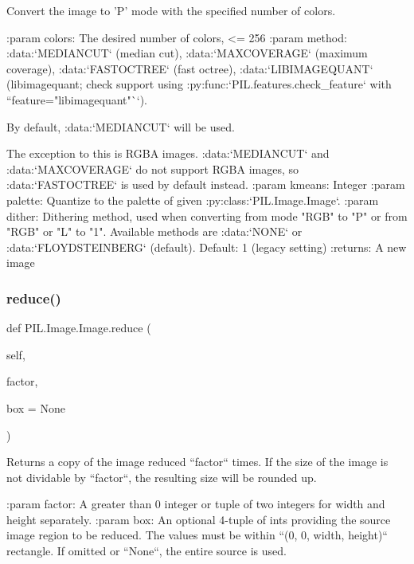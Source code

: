 \begin{DoxyVerb}Convert the image to 'P' mode with the specified number
of colors.

:param colors: The desired number of colors, <= 256
:param method: :data:`MEDIANCUT` (median cut),
       :data:`MAXCOVERAGE` (maximum coverage),
       :data:`FASTOCTREE` (fast octree),
       :data:`LIBIMAGEQUANT` (libimagequant; check support using
       :py:func:`PIL.features.check_feature`
       with ``feature="libimagequant"``).

       By default, :data:`MEDIANCUT` will be used.

       The exception to this is RGBA images. :data:`MEDIANCUT` and
       :data:`MAXCOVERAGE` do not support RGBA images, so
       :data:`FASTOCTREE` is used by default instead.
:param kmeans: Integer
:param palette: Quantize to the palette of given
        :py:class:`PIL.Image.Image`.
:param dither: Dithering method, used when converting from
   mode "RGB" to "P" or from "RGB" or "L" to "1".
   Available methods are :data:`NONE` or :data:`FLOYDSTEINBERG` (default).
   Default: 1 (legacy setting)
:returns: A new image\end{DoxyVerb}
 \mbox{\label{classPIL_1_1Image_1_1Image_a4a2352ec3f2155b13e8677188bbee94b}} 
\subsubsection{\texorpdfstring{reduce()}{reduce()}}
{\footnotesize\ttfamily def P\+I\+L.\+Image.\+Image.\+reduce (\begin{DoxyParamCaption}\item[{}]{self,  }\item[{}]{factor,  }\item[{}]{box = {\ttfamily None} }\end{DoxyParamCaption})}

\begin{DoxyVerb}Returns a copy of the image reduced ``factor`` times.
If the size of the image is not dividable by ``factor``,
the resulting size will be rounded up.

:param factor: A greater than 0 integer or tuple of two integers
   for width and height separately.
:param box: An optional 4-tuple of ints providing
   the source image region to be reduced.
   The values must be within ``(0, 0, width, height)`` rectangle.
   If omitted or ``None``, the entire source is used.
\end{DoxyVerb}
 \mbox{\label{classPIL_1_1Image_1_1Image_ac89a462dfa9a2c7bb0cf3a8f73a806de}} 
